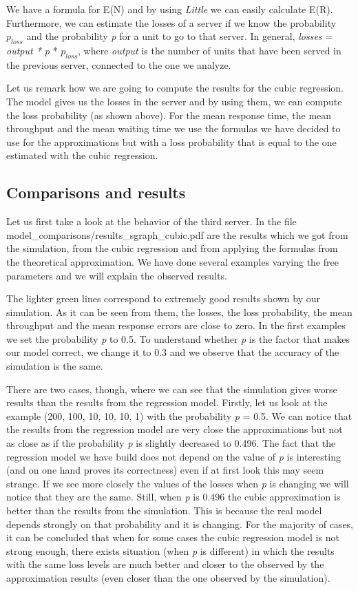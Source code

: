 \documentclass[12pt]{article}
\theoremstyle{plain}
\begin{document}
We have a formula for E(N) and by using \emph{Little} we can easily calculate
E(R). Furthermore, we can estimate the losses of a server if we know the
probability $p_{loss}$ and the probability \emph{p} for a unit to go to that
server. In general, \emph{losses} = \emph{output * p} * $p_{loss}$, where
\emph{output} is the number of units that have been served in the previous
server, connected to the one we analyze.

Let us remark how we are going to compute the results for the cubic regression.
The model gives us the losses in the server and by using them, we can compute
the loss probability (as shown above). For the mean response time, the mean
throughput and the mean waiting time we use the formulas we have decided to use
for the approximations but with a loss probability that is equal to the one
estimated with the cubic regression.

\subsection*{Comparisons and results}

Let us first take a look at the behavior of the third server. In the file
\linebreak model\_comparisons/results\_sgraph\_cubic.pdf are the results which we got from the
simulation, from the cubic regression and from applying the formulas from the
theoretical approximation. We have done several examples varying the free
parameters and we will explain the observed results.  

The lighter green lines correspond to extremely good results shown by our
simulation. As it can be seen from them, the losses, the loss probability, the
mean throughput and the mean response errors are close to zero. In the first
examples we set the probability \emph{p} to 0.5. To understand whether \emph{p}
is the factor that makes our model correct, we change it to 0.3 and we observe
that the accuracy of the simulation is the same.

There are two cases, though, where we can see that the simulation gives worse
results than the results from the regression model. Firstly, let us look at the
example (200, 100, 10, 10, 10, 1) with the probability \emph{p} = 0.5. We can notice
that the results from the regression model are very close the approximations but not as
close as if the probability \emph{p} is slightly decreased to 0.496. The fact
that the regression model we have build does not depend on the value of
\emph{p} is interesting (and on one hand proves its correctness) even if at
first look this may seem strange. If we see more closely the values of the
losses when \emph{p} is changing we will notice that they are the
same. Still, when \emph{p} is 0.496 the cubic approximation is better than the
results from the simulation.  This is because the real model depends strongly
on that probability and it is changing. For the majority of cases, it can be
concluded that when for some cases the cubic regression model is not strong
enough, there exists situation (when \emph{p} is different) in which the results
with the same loss levels are much better and closer to the observed by the approximation results
(even closer than the one observed by the simulation).
\end{document}
